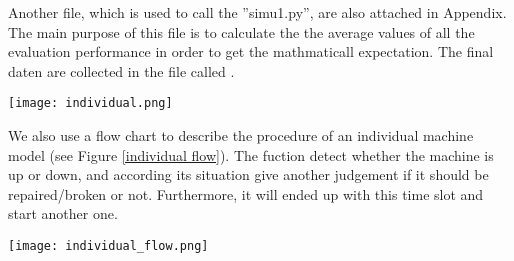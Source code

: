 Another file, which is used to call the ''simu1.py'', are also attached in Appendix. The main purpose of this file is to calculate the the average values of all the evaluation performance in order to get the mathmaticall expectation. The final daten are collected in the file called .


\begin{figure*}[!h]
	\centering
	\texttt{[image: individual.png]}
	\caption{UML diagram of an individual machine model}
	\label{individual uml}
\end{figure*}

We also use a flow chart to describe the procedure of an individual machine model (see Figure \ref{individual flow}). The fuction  detect whether the machine is up or down, and according its situation give another judgement if it should be repaired/broken or not. Furthermore, it will ended up with this time slot and start another one.

\begin{figure*}[!h]
	\centering
	\texttt{[image: individual\_flow.png]}
	\caption{Flow chart of an individual machine model}
	\label{individual flow}
\end{figure*}
